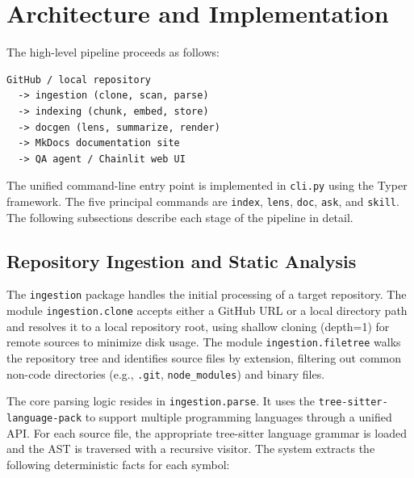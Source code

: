 \documentclass[10pt,twocolumn]{article}
\begin{document}
\section{Architecture and Implementation}

The high-level pipeline proceeds as follows:

\begin{lstlisting}
GitHub / local repository
  -> ingestion (clone, scan, parse)
  -> indexing (chunk, embed, store)
  -> docgen (lens, summarize, render)
  -> MkDocs documentation site
  -> QA agent / Chainlit web UI
\end{lstlisting}

The unified command-line entry point is implemented in \texttt{cli.py} using the Typer framework. The five principal commands are \texttt{index}, \texttt{lens}, \texttt{doc}, \texttt{ask}, and \texttt{skill}. The following subsections describe each stage of the pipeline in detail.

\subsection{Repository Ingestion and Static Analysis}

The \texttt{ingestion} package handles the initial processing of a target repository. The module \texttt{ingestion.clone} accepts either a GitHub URL or a local directory path and resolves it to a local repository root, using shallow cloning (depth=1) for remote sources to minimize disk usage. The module \texttt{ingestion.filetree} walks the repository tree and identifies source files by extension, filtering out common non-code directories (e.g., \texttt{.git}, \texttt{node\_modules}) and binary files.

The core parsing logic resides in \texttt{ingestion.parse}. It uses the \texttt{tree-sitter-language-pack} to support multiple programming languages through a unified API. For each source file, the appropriate tree-sitter language grammar is loaded and the AST is traversed with a recursive visitor. The system extracts the following deterministic facts for each symbol:
\end{document}
